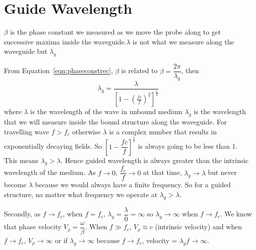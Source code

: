 \section{Guide Wavelength}
$\beta$ is the phase constant we measured as we move the probe along to get successive maxima inside the waveguide.$\lambda$ is not what we measure along the waveguide but $\lambda_g$

From Equation~\ref{eqn:phaseconstrec}, $\beta$ is related to  $\beta = \dfrac{2\pi}{\lambda_g}$, then 
\begin{dmath}
\lambda_g = \frac{\lambda}{\left[1-{\left(\frac{fc}{f}\right)}^2\right]^{\frac{1}{2}}}
\label{eqn:lambdag}
\end{dmath}
where $\lambda$ is the wavelength of the wave in unbound medium $\lambda_g$ is the wavelength that we will measure inside the bound structure along the waveguide. For travelling wave $f>f_c$ otherwise $\lambda$ is a complex number that results in exponentially decaying fields. So $\left[1-{\dfrac{fc}{f}}\right]^{\frac{1}{2}}$ is always going to be less than 1. This means $\lambda_g>\lambda$. Hence guided wavelength is always greater than the intrinsic wavelength of the medium. As $f\longrightarrow0$, $\dfrac{f_c}{f}\longrightarrow0$ at that time, $\lambda_g\longrightarrow\lambda$ but never become $\lambda$ because we would always have a finite frequency. So for a guided structure, no matter what frequency we operate at $\lambda_g>\lambda$.

Secondly, as $f\longrightarrow f_c$, when $f=f_c$, $\lambda_g = \dfrac{\lambda}{0} = \infty$ so $\lambda_g\longrightarrow\infty$ when $f\longrightarrow f_c$. We know that phase velocity $V_\rho = \dfrac{\omega}{\beta}$. When $f\gg f_c$, $V_\rho\approx c$ (intrinsic velocity) and when $f\longrightarrow f_c$, $V_\rho\longrightarrow\infty$ or if $\lambda_g\longrightarrow\infty$ because $f\longrightarrow f_c$, velocity = $\lambda_gf\longrightarrow\infty$.


